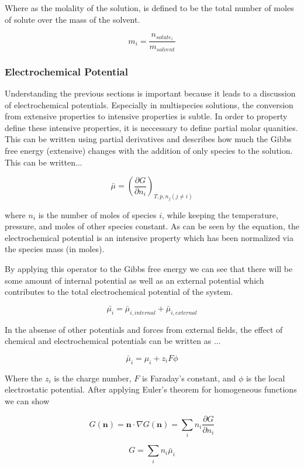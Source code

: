 \documentclass[lettersize,journal]{IEEEtran}
\begin{document}
 Where as the molality of the solution, is defined to be the total number of moles of solute over the mass of the solvent.

 \[
    m_i = \frac{n_{solute_i}}{m_{solvent}}
 \]


 \subsubsection{Electrochemical Potential}

 Understanding the previous sections is important because it leads to a discussion of electrochemical potentials. Especially in multispecies solutions, the conversion from extensive properties to intensive properties is subtle. In order to property define these intensive properties, it is neccessary to define partial molar quanities. This can be written using partial derivatives and describes how much the Gibbs free energy (extensive) changes with the addition of only species to the solution. This can be written...

 \[
    \bar{\mu} = \left( \frac{\partial G}{\partial n_{i}} \right)_{T,p,n_{j} (j \neq i)}
 \]

 where $n_i$ is the number of moles of species $i$, while keeping the temperature, pressure, and moles of other species constant. As can be seen by the equation, the electrochemical potential is an intensive property which has been normalized via the species mass (in moles).

 By applying this operator to the Gibbs free energy we can see that there will be some amount of internal potential as well as an external potential which contributes to the total electrochemical potential of the system.

\[
    \bar{\mu_{i}} = \bar{\mu}_{i, internal} + \bar{\mu}_{i, external}
\]

 In the absense of other potentials and forces from external fields, the effect of chemical and electrochemical potentials can be written as ...

 \[
    \bar{\mu}_{i} = \mu_{i} + z_i F \phi
 \]


Where the $z_i$ is the charge number, $F$ is Faraday's constant, and $\phi$ is the local electrostatic potential. After applying Euler's theorem for homogeneous functions we can show

\[
    G(\textbf{n}) = \textbf{n} \cdot \nabla G (\textbf{n}) = \sum_i n_i \frac{\partial G}{\partial n_i}
\]

\[
    G = \sum_i n_i \bar{\mu}_i
\]
\end{document}
